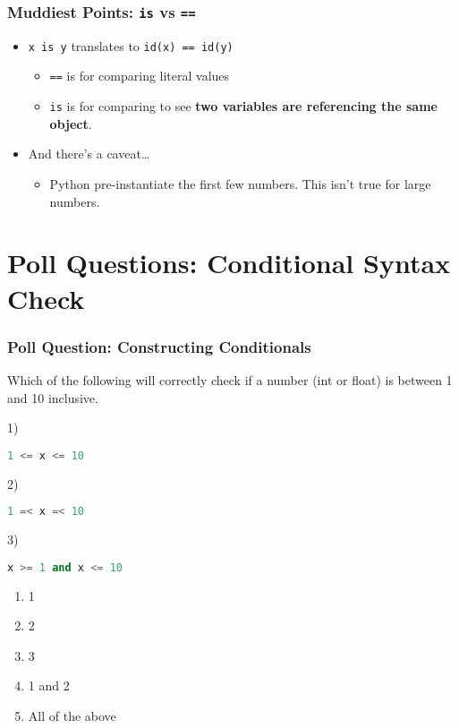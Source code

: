 \documentclass{beamer}
\begin{document}
%
%
\begin{frame}[fragile]
	\frametitle{Muddiest Points: \lstinline|is| vs \lstinline|==|}
  \begin{itemize}
    \item \lstinline|x is y| translates to \lstinline|id(x) == id(y)|
    \begin{itemize}
      \item \lstinline|==| is for comparing literal values
      \item \lstinline|is| is for comparing to see \textbf{two variables are referencing the same object}.
    \end{itemize}
    \item And there's a caveat\ldots 
    \begin{itemize}
      \item Python pre-instantiate the first few numbers. This isn't true for large numbers.
    \end{itemize}
  \end{itemize}
\end{frame}


\section{Poll Questions: Conditional Syntax Check}

%
%
\begin{frame}[fragile]
	\frametitle{Poll Question: Constructing Conditionals}
  Which of the following will correctly check if a number (int or float) is between 1 and 10 inclusive.
	\begin{minipage}{0.69\textwidth}
    1)
		\begin{lstlisting}[language=Python, autogobble,basicstyle=\tiny,numbers=none]
    1 <= x <= 10
		\end{lstlisting}
    \vspace{1cm}
    2)
		\begin{lstlisting}[language=Python, autogobble,basicstyle=\tiny,numbers=none]
    1 =< x =< 10
		\end{lstlisting}
    \vspace{1cm}
    3)
		\begin{lstlisting}[language=Python, autogobble,basicstyle=\tiny,numbers=none]
    x >= 1 and x <= 10
		\end{lstlisting}
	\end{minipage}
	\begin{minipage}{0.29\textwidth}
    \begin{enumerate}[A]
      \item 1
      \item 2
      \item 3
      \item 1 and 2
      \item All of the above
    \end{enumerate}
	\end{minipage}
\end{frame}
\end{document}
